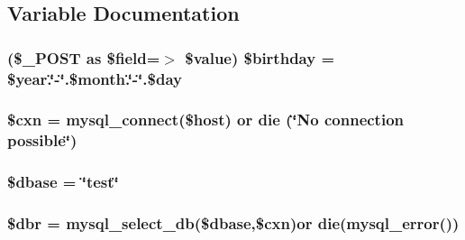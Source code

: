 \subsection{Variable Documentation}
\hypertarget{_m_c_mcreate_new_account_validator_8php_ab8d98de5aa650b9f437292caa496b146}{
\subsubsection[{\$birthday}]{ (\$\-\_\-\-P\-O\-S\-T as \$field=$>$ \$value) \$birthday = \$year.\char`\"{}-\/\char`\"{}.\$month.\char`\"{}-\/\char`\"{}.\$day}}\label{_m_c_mcreate_new_account_validator_8php_ab8d98de5aa650b9f437292caa496b146}
\hypertarget{_m_c_mcreate_new_account_validator_8php_afe14c5bdb9487c058ec831382f1fbacd}{
\subsubsection[{\$cxn}]{\setlength{\rightskip}{0pt plus 5cm}\$cxn = mysql\-\_\-connect(\$host) or die (\char`\"{}No connection possible\char`\"{})}}\label{_m_c_mcreate_new_account_validator_8php_afe14c5bdb9487c058ec831382f1fbacd}
\hypertarget{_m_c_mcreate_new_account_validator_8php_abd981912075cb8356ca370b4fefdfed7}{
\subsubsection[{\$dbase}]{\setlength{\rightskip}{0pt plus 5cm}\$dbase = \char`\"{}test\char`\"{}}}\label{_m_c_mcreate_new_account_validator_8php_abd981912075cb8356ca370b4fefdfed7}
\hypertarget{_m_c_mcreate_new_account_validator_8php_a88fea670240e5fa6ae306a286acaa0fd}{
\subsubsection[{\$dbr}]{\setlength{\rightskip}{0pt plus 5cm}\$dbr = mysql\-\_\-select\-\_\-db(\$dbase,\$cxn)or die(mysql\-\_\-error())}}\label{_m_c_mcreate_new_account_validator_8php_a88fea670240e5fa6ae306a286acaa0fd}
